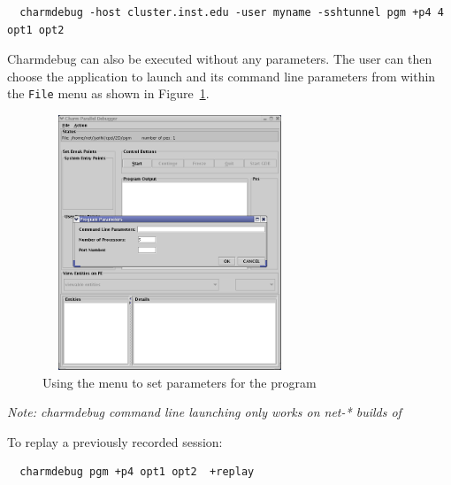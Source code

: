\documentclass[10pt]{article}
\begin{document}
\begin{verbatim}
  charmdebug -host cluster.inst.edu -user myname -sshtunnel pgm +p4 4 opt1 opt2
\end{verbatim}

Charmdebug can also be executed without any parameters.  The user can
then choose the application to launch and its command line parameters
from within the \texttt{File} menu as shown in Figure~\ref{menu}.

\begin{figure}[]
\includegraphics[scale=0.5, height=3in, width=3in]{figs/menu}
\caption{Using the menu to set parameters for the \charmpp{} program}
\label{menu}
\end{figure}


\emph{Note: charmdebug command line launching only works on net-*
builds of \charmpp{} }

To replay a previously recorded session:

\begin{verbatim}
  charmdebug pgm +p4 opt1 opt2  +replay
\end{verbatim}




\end{document}
